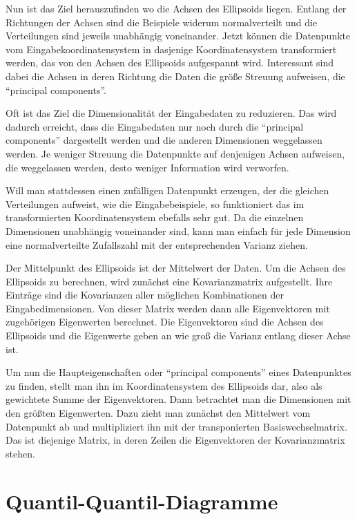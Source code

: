  Nun ist das Ziel herauszufinden wo die Achsen des Ellipsoids liegen. Entlang der Richtungen der Achsen sind die Beispiele widerum normalverteilt und die Verteilungen sind jeweils unabhängig voneinander.
 Jetzt können die Datenpunkte vom Eingabekoordinatensystem in dasjenige Koordinatensystem transformiert werden, das von den Achsen des Ellipsoids aufgespannt wird. Interessant sind dabei die Achsen in deren Richtung die Daten die größe Streuung aufweisen, die "`principal components"'. 
 
 Oft ist das Ziel die Dimensionalität der Eingabedaten zu reduzieren. Das wird dadurch erreicht, dass die Eingabedaten nur noch durch die "`principal components"' dargestellt werden und die anderen Dimensionen weggelassen werden. Je weniger Streuung die Datenpunkte auf denjenigen Achsen aufweisen, die weggelassen werden, desto weniger Information wird verworfen.
 
 Will man stattdessen einen zufälligen Datenpunkt erzeugen, der die gleichen Verteilungen aufweist, wie die Eingabebeispiele, so funktioniert das im transformierten Koordinatensystem ebefalls sehr gut. Da die einzelnen Dimensionen unabhängig voneinander sind, kann man einfach für jede Dimension eine normalverteilte Zufallszahl mit der entsprechenden Varianz ziehen.
 
 Der Mittelpunkt des Ellipsoids ist der Mittelwert der Daten.
 Um die Achsen des Ellipsoids zu berechnen, wird zunächst eine Kovarianzmatrix aufgestellt. Ihre Einträge sind die Kovarianzen aller möglichen Kombinationen der Eingabedimensionen. Von dieser Matrix werden dann alle Eigenvektoren mit zugehörigen Eigenwerten berechnet.
 Die Eigenvektoren sind die Achsen des Ellipsoids und die Eigenwerte geben an wie groß die Varianz entlang dieser Achse ist.
 
 Um nun die Haupteigenschaften oder "`principal components"' eines Datenpunktes zu finden, stellt man ihn im Koordinatensystem des Ellipsoids dar, also als gewichtete Summe der Eigenvektoren. Dann betrachtet man die Dimensionen mit den größten Eigenwerten. Dazu zieht man zunächst den Mittelwert vom Datenpunkt ab und multipliziert ihn mit der transponierten Basiswechselmatrix. Das ist diejenige Matrix, in deren Zeilen die Eigenvektoren der Kovarianzmatrix stehen.

 
\section{Quantil-Quantil-Diagramme} 
\label{qqdiagrams}


